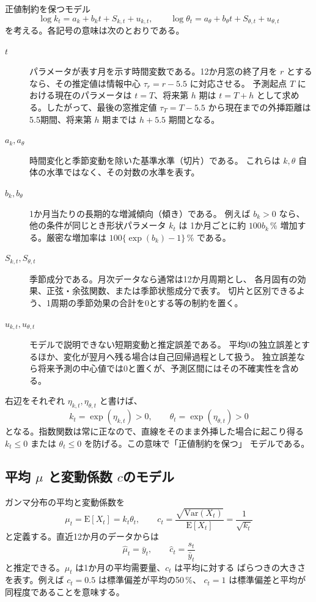 \documentclass[a4paper,11pt]{jsarticle}
\begin{document}
正値制約を保つモデル
\[
\log k_t=a_k+b_kt+S_{k,t}+u_{k,t},\qquad
\log\theta_t=a_\theta+b_\theta t+S_{\theta,t}+u_{\theta,t}
\]
を考える。各記号の意味は次のとおりである。
\begin{description}
\item[$t$] パラメータが表す月を示す時間変数である。12か月窓の終了月を
$r$ とするなら、その推定値は情報中心 $\tau_r=r-5.5$ に対応させる。
予測起点 $T$ における現在のパラメータは $t=T$、将来第 $h$ 期は
$t=T+h$ として求める。したがって、最後の窓推定値 $\tau_T=T-5.5$
から現在までの外挿距離は5.5期間、将来第 $h$ 期までは $h+5.5$ 期間となる。
\item[$a_k,a_\theta$] 時間変化と季節変動を除いた基準水準（切片）である。
これらは $k,\theta$ 自体の水準ではなく、その対数の水準を表す。
\item[$b_k,b_\theta$] 1か月当たりの長期的な増減傾向（傾き）である。
例えば $b_k>0$ なら、他の条件が同じとき形状パラメータ $k_t$ は
1か月ごとに約 $100b_k$\,\% 増加する。厳密な増加率は
$100\{\exp(b_k)-1\}$\,\% である。
\item[$S_{k,t},S_{\theta,t}$] 季節成分である。月次データなら通常は12か月周期とし、
各月固有の効果、正弦・余弦関数、または季節状態成分で表す。
切片と区別できるよう、1周期の季節効果の合計を0とする等の制約を置く。
\item[$u_{k,t},u_{\theta,t}$] モデルで説明できない短期変動と推定誤差である。
平均0の独立誤差とするほか、変化が翌月へ残る場合は自己回帰過程として扱う。
独立誤差なら将来予測の中心値では0と置くが、予測区間にはその不確実性を含める。
\end{description}

右辺をそれぞれ $\eta_{k,t},\eta_{\theta,t}$ と書けば、
\[
k_t=\exp(\eta_{k,t})>0,\qquad
\theta_t=\exp(\eta_{\theta,t})>0
\]
となる。指数関数は常に正なので、直線をそのまま外挿した場合に起こり得る
$k_t\leq0$ または $\theta_t\leq0$ を防げる。この意味で「正値制約を保つ」
モデルである。

\subsection{\texorpdfstring{平均 $\mu$ と変動係数 $c$}
{平均 mu と変動係数 c}のモデル}

ガンマ分布の平均と変動係数を
\[
\mu_t=\mathrm{E}[X_t]=k_t\theta_t,\qquad
c_t=\frac{\sqrt{\mathrm{Var}(X_t)}}{\mathrm{E}[X_t]}
    =\frac{1}{\sqrt{k_t}}
\]
と定義する。直近12か月のデータからは
\[
\hat\mu_t=\bar y_t,\qquad
\hat c_t=\frac{s_t}{\bar y_t}
\]
と推定できる。$\mu_t$ は1か月の平均需要量、$c_t$ は平均に対する
ばらつきの大きさを表す。例えば $c_t=0.5$ は標準偏差が平均の50\,\%、
$c_t=1$ は標準偏差と平均が同程度であることを意味する。
\end{document}
